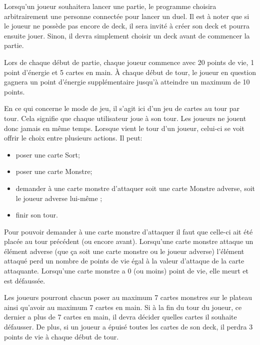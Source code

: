 \documentclass[11pt,a4paper]{article}
\begin{document}
\medbreak

Lorsqu'un joueur souhaitera lancer une partie, le programme choisira arbitrairement une personne connectée pour lancer un duel. Il est à noter que si le joueur ne possède pas encore de deck, il sera invité à créer son deck et pourra ensuite jouer. Sinon, il devra simplement choisir un deck avant de commencer la partie.

\medbreak

Lors de chaque début de partie, chaque joueur commence avec 20 points de vie, 1 point d'énergie et 5 cartes en main. À chaque début de tour, le joueur en question gagnera un point d'énergie supplémentaire jusqu'à atteindre un maximum de 10 points.

\medbreak

En ce qui concerne le mode de jeu, il s'agit ici d'un jeu de cartes au tour par tour.  Cela signifie que chaque utilisateur joue à son tour.  Les joueurs ne jouent donc jamais en même temps.  Lorsque vient le tour d'un joueur, celui-ci se voit offrir le choix entre plusieurs actions. Il peut:

\begin{itemize}
 \item[\textbullet] poser une carte Sort;
 \item[\textbullet] poser une carte Monstre;
 \item[\textbullet] demander à une carte monstre d'attaquer soit une carte Monstre adverse, soit le joueur adverse lui-même ;
 \item[\textbullet] finir son tour.
\end{itemize}

Pour pouvoir demander à une carte monstre d'attaquer il faut que celle-ci ait été placée au tour précédent (ou encore avant).  Lorsqu'une carte monstre attaque un élément adverse (que ça soit une carte monstre ou le joueur adverse) l'élément attaqué perd un nombre de points de vie égal à la valeur d'attaque de la carte attaquante. Lorsqu'une carte monstre a 0 (ou moins) point de vie, elle meurt et est défaussée.

\medbreak


Les joueurs pourront chacun poser au maximum 7 cartes monstres sur le plateau ainsi qu'avoir au maximum 7 cartes en main. Si à la fin du tour du joueur, ce dernier a plus de 7 cartes en main, il devra décider quelles cartes il souhaite défausser. De plus, si un joueur a épuisé toutes les cartes de son deck, il perdra 3 points de vie à chaque début de tour.
\end{document}
